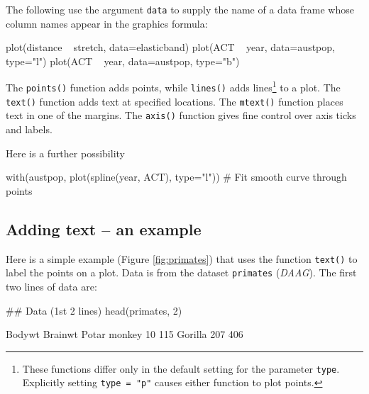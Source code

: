 \documentclass{tufte-book}\usepackage[]{graphicx}\usepackage[]{color}
\newcommand{\txtt}[1]{\texttt{#1}}
\begin{document}
The following use the argument \txtt{data} to supply the name of a
data frame whose column names appear in the graphics formula:
\begin{Schunk}
\begin{Sinput}
plot(distance ~ stretch, data=elasticband)
plot(ACT ~ year, data=austpop, type="l")
plot(ACT ~ year, data=austpop, type="b")
\end{Sinput}
\end{Schunk}

The \txtt{points()} function adds points, while \txtt{lines()} adds
lines\footnote{These functions differ only in the default
  setting for the parameter \txtt{type}{\small .}  Explicitly setting
\txtt{type = "p"} causes either function to plot points.}  to a plot.
The \txtt{text()} function adds text at specified locations.  The
\txtt{mtext()} function places text in one of the margins.  The
\txtt{axis()} function gives fine control over axis ticks and labels.

Here is a further possibility
\begin{Schunk}
\begin{Sinput}
with(austpop, plot(spline(year, ACT), type="l"))
  # Fit smooth curve through points
\end{Sinput}
\end{Schunk}

\subsection*{Adding text -- an example}\label{ss:addpoints}
Here is a simple example (Figure \ref{fig:primates}) that uses the
function \txtt{text()} to label the points on a plot. Data is from
the dataset \txtt{primates} ({\em DAAG}).  The first two lines of
data are:
\begin{Schunk}
\begin{Sinput}
## Data (1st 2 lines)
head(primates, 2)
\end{Sinput}
\begin{Soutput}
             Bodywt Brainwt
Potar monkey     10     115
Gorilla         207     406
\end{Soutput}
\end{Schunk}
\end{document}
